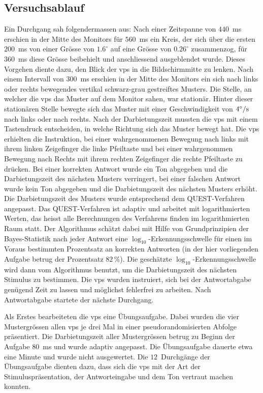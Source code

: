 \documentclass[11pt, twoside, a4paper]{book}		%
\begin{document}
\subsection{Versuchsablauf \label{subsec:Prozedur}}

Ein Durchgang sah folgendermassen aus: Nach einer Zeitspanne von $440$~ms erschien in der Mitte des Monitors für $560$~ms ein Kreis, der sich über die ersten $200$~ms von einer Grösse von $1.6^{\circ}$ auf eine Grösse von $0.26^{\circ}$ zusammenzog, für $360$~ms diese Grösse beibehielt und anschliessend ausgeblendet wurde. Dieses Vorgehen diente dazu, den Blick der \glspl{vp} in die Bildschirmmitte zu lenken. Nach einem  Intervall von $300$~ms erschien in der Mitte des Monitors ein sich nach links oder rechts bewegendes vertikal schwarz-grau gestreiftes Musters. Die Stelle, an welcher die \glspl{vp} das Muster auf dem Monitor sahen, war stationär. Hinter dieser stationären Stelle bewegte sich das Muster mit einer Geschwindigkeit von $4^\circ / \textnormal{s} $  nach links oder nach rechts. Nach der Darbietungszeit mussten die \glspl{vp} mit einem Tastendruck entscheiden, in welche Richtung sich das Muster bewegt hat. Die \glspl{vp} erhielten die Instruktion, bei einer wahrgenommenen Bewegung nach links mit ihrem linken Zeigefinger die linke Pfeiltaste  und bei einer wahrgenommen Bewegung nach Rechts mit ihrem rechten Zeigefinger die rechte Pfeiltaste zu drücken. 
Bei einer korrekten Antwort wurde ein Ton abgegeben und die Darbietungszeit des nächsten Musters verringert, bei einer falschen Antwort wurde kein Ton abgegeben und die Darbietungszeit des nächsten Musters erhöht. 
Die Darbietungszeit des Musters wurde entsprechend dem QUEST-Ver\-fah\-ren \citep{Watson1983} angepasst.
Das QUEST-Ver\-fah\-ren ist adaptiv und arbeitet mit logarithmierten Werten, das heisst alle Berechnungen des Verfahrens finden im logarithmierten Raum statt. Der Algorithmus schätzt dabei mit Hilfe von Grundprinzipien der Bayes-Statistik nach jeder Antwort eine $\log_{10}$-Erkennungsschwelle für einen im Voraus bestimmten Prozentsatz an korrekten Antworten (in der hier vorliegenden Aufgabe betrug der Prozentsatz $82\,\%$).
Die geschätzte $\log_{10}$-Erkennungsschwelle wird dann vom Algorithmus benutzt, um die Darbietungszeit des nächsten Stimulus zu bestimmen. 
Die \glspl{vp} wurden instruiert, sich bei der Antwortabgabe genügend Zeit zu lassen und möglichst fehlerfrei zu arbeiten. Nach Antwortabgabe startete der nächste Durchgang.

Als Erstes bearbeiteten die \glspl{vp} eine Übungsaufgabe. Dabei wurden die vier Mustergrössen allen \glspl{vp} je drei Mal in einer pseudorandomisierten Abfolge präsentiert. Die Darbietungszeit aller Mustergrössen betrug zu Beginn der Aufgabe $80$~ms und wurde adaptiv angepasst. Die Übungsaufgabe dauerte etwa eine Minute und wurde nicht ausgewertet. Die $12$~Durchgänge der Übungsaufgabe dienten dazu, dass sich die \glspl{vp} mit der Art der Stimuluspräsentation, der Antworteingabe und dem Ton vertraut machen konnten. 
\end{document}
